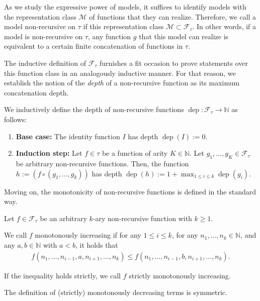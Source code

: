As we study the expressive power of models, it suffices to identify models with the representation class $\mathcal{M}$ of functions that they can realize.
Therefore, we call a model non-recursive on $\tau$ if this representation class $\mathcal{M}\subset \mathcal{F}_{\tau}$.
In other words, if a model is non-recursive on $\tau$, any function $g$ that this model can realize is equivalent to a certain finite concatenation of functions in $\tau$.


The inductive definition of $\mathcal{F}_{\tau}$ furnishes a fit occasion to prove statements over this function class in an analogously inductive manner.
For that reason, we establish the notion of the \textit{depth} of a non-recursive function as its maximum concatenation depth.

\begin{definition}
	\label{def:non-recursive-functions-depth}
	We inductively define the depth of non-recursive functions $\operatorname{dep}:\mathcal{F}_{\tau}\to\mathbb{N}$ as follows:
	\begin{enumerate}
		\item \textbf{Base case:} The identity function $I$ has depth $\operatorname{dep}(I):=0$. 
		\item \textbf{Induction step:} Let $f\in\tau$ be a function of arity $K\in\mathbb{N}$. Let $g_1,\dots,g_K\in\mathcal{F}_{\tau}$ be arbitrary non-recursive functions. Then, the function $h:=(f\circ(g_1,\dots,g_k))$ has depth $\operatorname{dep}(h):=1+\max_{1\leq i\leq k}\operatorname{dep}(g_i)$.
	\end{enumerate}
\end{definition}

Moving on, the monotonicity of non-recursive functions is defined in the standard way.
\begin{definition}
	\label{def:non-recursive-functions-monotonous}
	Let $f\in \mathcal{F}_{\tau}$ be an arbitrary $k$-ary non-recursive function with $k\geq 1$.
	
	We call $f$ monotonously increasing if for any $1\leq i\leq k$, for any $n_1,\dots,n_k\in \mathbb{N}$, and any $a,b\in\mathbb{N}$ with $a<b$, it holds that
	\begin{align*}
		f(n_1,\dots,n_{i-1},a,n_{i+1},\dots,n_k) \leq f(n_1,\dots,n_{i-1},b,n_{i+1},\dots,n_k).
	\end{align*}
	
	If the inequality holds strictly, we call $f$ strictly monotonously increasing.
	
	The definition of (strictly) monotonously decreasing terms is symmetric.
\end{definition}

